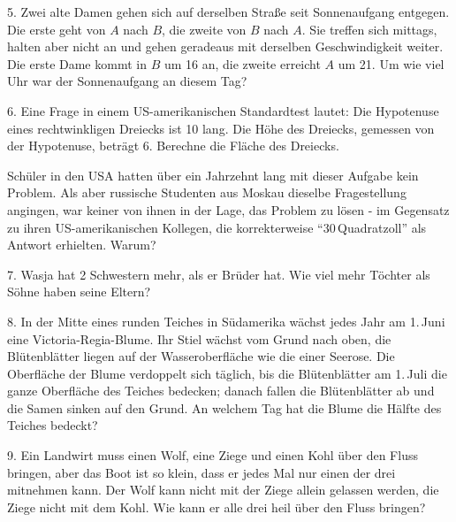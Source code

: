 \begin{problem}{5.}
	Zwei alte Damen gehen sich auf derselben Straße seit Sonnenaufgang entgegen. Die erste geht von $A$ nach $B$, die zweite von $B$ nach $A$. Sie treffen sich mittags, halten aber nicht an und gehen geradeaus mit derselben Geschwindigkeit weiter. Die erste Dame kommt in $B$ um \SI{16}{\uhr} an, die zweite erreicht $A$ um \SI{21}{\uhr}. Um wie viel Uhr war der Sonnenaufgang an diesem Tag?
\end{problem}

\begin{problem}{6.}
	Eine Frage in einem US-amerikanischen Standardtest lautet: Die Hypotenuse eines rechtwinkligen Dreiecks ist \SI{10}{\zoll} lang. Die Höhe des Dreiecks, gemessen von der Hypotenuse, beträgt \SI{6}{\zoll}. Berechne die Fläche des Dreiecks.

	Schüler in den USA hatten über ein Jahrzehnt lang mit dieser Aufgabe kein Problem. Als aber russische Studenten aus Moskau dieselbe Fragestellung angingen, war keiner von ihnen in der Lage, das Problem zu lösen - im Gegensatz zu ihren US-amerikanischen Kollegen, die korrekterweise \enquote{30\,Quadratzoll} als Antwort erhielten. Warum?
\end{problem}

\begin{problem}{7.}
	Wasja hat 2 Schwestern mehr, als er Brüder hat. Wie viel mehr Töchter als Söhne haben seine Eltern?
\end{problem}

\begin{problem}{8.}
	In der Mitte eines runden Teiches in Südamerika wächst jedes Jahr am 1.\,Juni eine Victoria-Regia-Blume. Ihr Stiel wächst vom Grund nach oben, die Blütenblätter liegen auf der Wasseroberfläche wie die einer Seerose. Die Oberfläche der Blume verdoppelt sich täglich, bis die Blütenblätter am 1.\,Juli die ganze Oberfläche des Teiches bedecken; danach fallen die Blütenblätter ab und die Samen sinken auf den Grund. An welchem Tag hat die Blume die Hälfte des Teiches bedeckt? 
\end{problem}

\begin{problem}{9.}
	Ein Landwirt muss einen Wolf, eine Ziege und einen Kohl über den Fluss bringen, aber das Boot ist so klein, dass er jedes Mal nur einen der drei mitnehmen kann. Der Wolf kann nicht mit der Ziege allein gelassen werden, die Ziege nicht mit dem Kohl. Wie kann er alle drei heil über den Fluss bringen? 
\end{problem}

